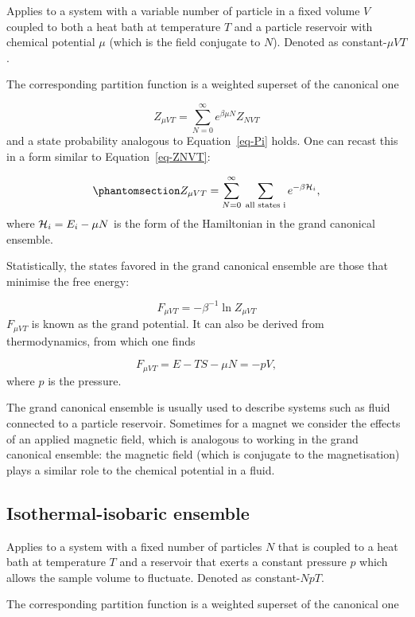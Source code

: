 \documentclass[
  letterpaper,
  DIV=11,
  numbers=noendperiod]{scrreprt}
\begin{document}
Applies to a system with a variable number of particle in a fixed volume
\(V\) coupled to both a heat bath at temperature \(T\) and a particle
reservoir with chemical potential \(\mu\) (which is the field conjugate
to \(N\)). Denoted as constant-\(\mu VT\).

The corresponding partition function is a weighted superset of the
canonical one

\[
Z_{\mu VT}=\sum_{N=0}^\infty e^{\beta\mu N}Z_{NVT}
\] and a state probability analogous to Equation~\ref{eq-Pi} holds. One
can recast this in a form similar to Equation~\ref{eq-ZNVT}:

\begin{equation}\phantomsection\label{eq-ZmuVT}{
Z_{\mu VT}=\sum_{N=0}^\infty\:\sum_\textrm{all~states~i}e^{-\beta {\cal H}_i},
}\end{equation} where \({\cal H}_i=E_i-\mu N\) is the form of the
Hamiltonian in the grand canonical ensemble.

Statistically, the states favored in the grand canonical ensemble are
those that minimise the free energy:

\[
F_{\mu VT}=-\beta^{-1}\ln Z_{\mu VT}
\] \(F_{\mu VT}\) is known as the grand potential. It can also be
derived from thermodynamics, from which one finds

\[
F_{\mu VT}=E-TS-\mu N=-pV,
\] where \(p\) is the pressure.

The grand canonical ensemble is usually used to describe systems such as
fluid connected to a particle reservoir. Sometimes for a magnet we
consider the effects of an applied magnetic field, which is analogous to
working in the grand canonical ensemble: the magnetic field (which is
conjugate to the magnetisation) plays a similar role to the chemical
potential in a fluid.

\subsection*{Isothermal-isobaric
ensemble}\label{isothermal-isobaric-ensemble}

Applies to a system with a fixed number of particles \(N\) that is
coupled to a heat bath at temperature \(T\) and a reservoir that exerts
a constant pressure \(p\) which allows the sample volume to fluctuate.
Denoted as constant-\(NpT\).

The corresponding partition function is a weighted superset of the
canonical one
\end{document}
